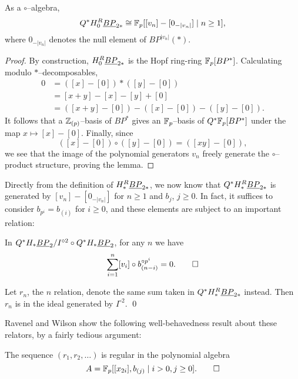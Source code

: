 \begin{lemma}
As a $\circ$--algebra, \[Q^* H_0^R \underline{\smash{BP}}_{2*} \cong \mathbb F_p[[v_n] - [0_{-|v_n|}] \mid n \ge 1],\] where $0_{-|v_n|}$ denotes the null element of $BP^{|v_n|}(*)$.
\end{lemma}
\begin{proof}
By construction, $H_0^R \underline{\smash{BP}}_{2*}$ is the Hopf ring-ring $\mathbb F_p[BP^*]$.  Calculating modulo $\ast$--decomposables,
\begin{align*}
0 & = ([x] - [0]) \ast ([y] - [0]) \\
& = [x + y] - [x] - [y] + [0] \\
& = ([x + y] - [0]) - ([x] - [0]) - ([y] - [0]).
\end{align*}
It follows that a $\mathbb Z_{(p)}$--basis of $BP^*$ gives an $\mathbb F_p$--basis of $Q^* \mathbb F_p[BP^*]$ under the map $x \mapsto [x] - [0]$.  Finally, since \[([x] - [0]) \circ ([y] - [0]) = ([xy] - [0]),\] we see that the image of the polynomial generators $v_n$ freely generate the $\circ$--product structure, proving the lemma.
\end{proof}

Directly from the definition of $H_*^R \underline{\smash{BP}}_{2*}$, we now know that $Q^* H_*^R \underline{\smash{BP}}_{2*}$ is generated by $[v_n] - [0_{-|v_n|}]$ for $n \ge 1$ and $b_j$, $j \ge 0$.  In fact, it suffices to consider $b_{p^i} = b_{(i)}$ for $i \ge 0$, and these elements are subject to an important relation:

\begin{lemma}
In $Q^* H_* \underline{\smash{BP}}_{2} / I^{\circ 2} \circ Q^* H_* \underline{\smash{BP}}_{2}$, for any $n$ we have \[\sum_{i=1}^n [v_i] \circ b_{(n-i)}^{\circ p^i} = 0. \qed\]
\end{lemma}

\begin{corollary}
Let $r_n$, the $n${\th} relation, denote the same sum taken in $Q^* H_*^R \underline{\smash{BP}}_{2*}$ instead.  Then $r_n$ is in the ideal generated by $I^{\circ 2}$. \qed {}
\end{corollary}

Ravenel and Wilson show the following well-behavedness result about these relators, by a fairly tedious argument:

\begin{lemma}
The sequence $(r_1, r_2, \ldots)$ is regular in the polynomial algebra \[A = \mathbb F_p[[x_{2i}], b_{(j)} \mid i > 0, j \ge 0]. \qed\]
\end{lemma}

